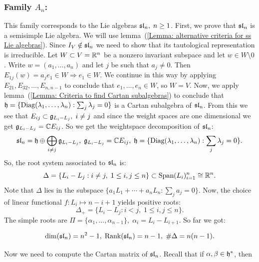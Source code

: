 \subsubsection{\texorpdfstring{Family $A_n$:}{Family :}}
This family corresponds to the Lie algebras $\mathfrak{sl}_{n},\;n\geq1$. 
First, we prove that $\mathfrak{sl}_n$ is a semisimple Lie algebra. We will use lemma~(\ref{Lemma: alternative criteria for ss Lie algebras}). 
Since $I_V\notin\mathfrak{sl}_n$ we need to show that its tautological representation is irreducible. Let $W\subset V=\mathbb{R}^n$ be a 
nonzero invariant subspace and let $w\in W\setminus0$. Write $w=(a_1,\dots,a_n)$ and let $j$ be such that $a_j\neq0$. Then 
$E_{1j}(w)=a_je_1\in W\Rightarrow e_1\in W$. We continue in this way by applying $E_{21},E_{32},\dots, E_{n,n-1}$ to conclude that 
$e_1,\dots, e_n\in W$, so $W=V$. Now, we apply lemma~(\ref{Lemma: Criteria to find Cartan subalgebras}) to conclude that 
$\mathfrak{h}=\{\text{Diag}(\lambda_1,\dots,\lambda_n):\sum_j\lambda_j=0\}$ is a Cartan subalgebra of $\mathfrak{sl}_n$. From this we see that 
$E_{ij}\subset\mathfrak{g}_{L_i-L_j},\;i\neq j$ and since the weight spaces are one dimensional we get $\mathfrak{g}_{L_i-L_j}=\mathbb{C} E_{ij}$. So we 
get the weightspace decomposition of $\mathfrak{sl}_n$:
\begin{equation}
    \mathfrak{sl}_n = \mathfrak{h}\oplus\bigoplus_{i\neq j}\mathfrak{g}_{L_i-L_j},\;\mathfrak{g}_{L_i-L_j}=\mathbb{C} E_{ij},\; \mathfrak{h}=\{\text{Diag}(\lambda_1,\dots,\lambda_n):\sum_j\lambda_j=0\}.
\end{equation}
So, the root system associated to $\mathfrak{sl}_n$ is:
\begin{equation}
    \Delta=\{L_i-L_j:i\neq j,\; 1\leq i,j\leq n\}\subset \text{Span}(L_i)_{i=1}^n\cong\mathbb{R}^n.
\end{equation}
Note that $\Delta$ lies in the subspace $\{a_1L_1+\cdots+a_nL_n:\sum_ja_j=0\}$. Now,
the choice of linear functional $f: L_i\mapsto n-i+1$ yields positive roots:
\begin{equation}
\Delta_+=\{L_i-L_j:i<j,\;1\leq i,j\leq n\}.    
\end{equation}
The simple roots are $\Pi=\{\alpha_1,\dots,\alpha_{n-1}\},\;\alpha_i=L_i-L_{i+1}$. So far we got:
\begin{dang}
    \begin{equation}
    \dim(\mathfrak{sl}_n)=n^2-1,\;\text{Rank}(\mathfrak{sl}_n)=n-1,\;\#\Delta = n(n-1).
\end{equation}
\end{dang}
Now we need to compute the Cartan matrix of $\mathfrak{sl}_n$. Recall that 
if $\alpha,\beta\in\mathfrak{h}^*$, then 
